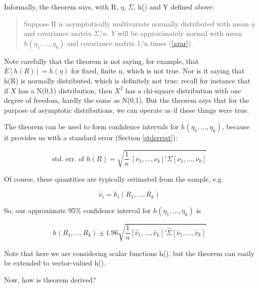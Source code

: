 Informally, the theorem says, with R, $\eta$, $\Sigma$, h() and Y
defined above:

\begin{quote}
Suppose R is asymptotically multivariate normally distributed
with mean $\eta$ and covariance matrix $\Sigma/n$.  $Y$ will be 
approximately normal with mean $h(\eta_1,...,\eta_k)$ and covariance 
matrix 1/n times (\ref{avar}).  
\end{quote} 

Note carefully that the theorem is not saying, for example, that
$E[h(R)] = h(\eta)$ for fixed, finite n, which is not true.  Nor is it
saying that h(R) is normally distributed, which is definitely not true;
recall for instance that if $X$ has a N(0,1) distribution, then $X^2$
has a chi-square distribution with one degree of freedom, hardly the
same as N(0,1).  But the theorem says that for the purpose of asymptotic
distributions, we can operate as if these things were true.

The theorem can be used to form confidence intervals for
$h(\eta_1,...,\eta_k)$, because it provides us with a standard error
(Section \ref{stderrest}): 

\begin{equation}
\textrm{std. err. of } h(R) = \sqrt{\frac{1}{n} ~ 
[\nu_1,...,\nu_k]' \Sigma [\nu_1,...,\nu_k]}
\end{equation}

Of course, these quantities are typically estimated from the sample,
e.g.

\begin{equation}
\widehat{\nu}_i = h_i(R_1,...,R_k)
\end{equation}

So, our approximate 95\% confidence interval for $h(\eta_1,...,\eta_k)$
is 

\begin{equation}
\label{deltaci}
h(R_1,...,R_k) \pm 1.96 
\sqrt{
\frac{1}{n}
[\widehat{\nu}_1,...,\widehat{\nu}_k]' \widehat{\Sigma} [\widehat{\nu}_1,...,\widehat{\nu}_k]
}
\end{equation}


Note that here we are considering scalar functions h(), but the theorem
can easily be extended to vector-valued h().

Now, how is theorem derived?

